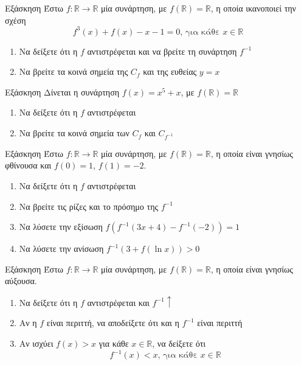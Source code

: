\documentclass{presentation}
\begin{document}
\begin{frame}{Εξάσκηση}
  Έστω $f:\mathbb{R}\to\mathbb{R}$ μία συνάρτηση, με $f(\mathbb{R})=\mathbb{R}$, η οποία ικανοποιεί την σχέση
  $$f^3(x)+f(x)-x-1=0\text{, για κάθε }x\in \mathbb{R}$$
  \begin{enumerate}
    \item Να δείξετε ότι η $f$ αντιστρέφεται και να βρείτε τη συνάρτηση $f^{-1}$ \pause
    \item Να βρείτε τα κοινά σημεία της $C_f$ και της ευθείας $y=x$
  \end{enumerate}
\end{frame}

\begin{frame}{Εξάσκηση}
  Δίνεται η συνάρτηση $f(x)=x^5+x$, με $f(\mathbb{R})=\mathbb{R}$
  \begin{enumerate}
    \item Να δείξετε ότι η $f$ αντιστρέφεται \pause
    \item Να βρείτε τα κοινά σημεία των $C_f$ και $C_{f^{-1}}$
  \end{enumerate}
\end{frame}

\begin{frame}{Εξάσκηση}
  Έστω $f:\mathbb{R}\to\mathbb{R}$ μία συνάρτηση, με $f(\mathbb{R})=\mathbb{R}$, η οποία είναι γνησίως φθίνουσα και $f(0)=1$, $f(1)=-2$.
  \begin{enumerate}
    \item Να δείξετε ότι η $f$ αντιστρέφεται \pause
    \item Να βρείτε τις ρίζες και το πρόσημο της $f^{-1}$ \pause
    \item Να λύσετε την εξίσωση $f\left(f^{-1}(3x+4)-f^{-1}(-2)\right)=1$ \pause
    \item Να λύσετε την ανίσωση $f^{-1}\left(3+f(\ln x)\right)>0$
  \end{enumerate}
\end{frame}

\begin{frame}{Εξάσκηση}
  Έστω $f:\mathbb{R}\to\mathbb{R}$ μία συνάρτηση, με $f(\mathbb{R})=\mathbb{R}$, η οποία είναι γνησίως αύξουσα.
  \begin{enumerate}
    \item Να δείξετε ότι η $f$ αντιστρέφεται και $f^{-1}\uparrow$\pause
    \item Αν η $f$ είναι περιττή, να αποδείξετε ότι και η $f^{-1}$ είναι περιττή \pause
    \item Αν ισχύει $f(x)>x$ για κάθε $x\in\mathbb{R}$, να δείξετε ότι
          $$f^{-1}(x)<x\text{, για κάθε }x\in\mathbb{R}$$
  \end{enumerate}
\end{frame}
\end{document}
